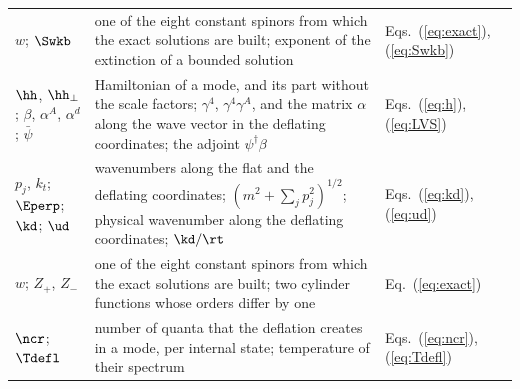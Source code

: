\begin{table}
\begin{ruledtabular}
\begin{tabular}{p{}p{}p{}}
$w$; $\Swkb$ & one of the eight constant spinors from which the exact solutions are built; exponent of the extinction of a bounded solution & Eqs.~(\ref{eq:exact}), (\ref{eq:Swkb}) \\
$\hh$, $\hh_\perp$; $\beta$, $\alpha^{A}$, $\alpha^{d}$; $\bar\psi$ & Hamiltonian of a mode, and its part without the scale factors; $\gamma^{4}$, $\gamma^{4}\gamma^{A}$, and the matrix $\alpha$ along the wave vector in the deflating coordinates; the adjoint $\psi^\dagger\beta$ & Eqs.~(\ref{eq:h}), (\ref{eq:LVS}) \\
$p_j$, $k_t$; $\Eperp$; $\kd$; $\ud$ & wavenumbers along the flat and the deflating coordinates; $(m^{2}+\sum_jp_j^{2})^{1/2}$; physical wavenumber along the deflating coordinates; $\kd/\rt$ & Eqs.~(\ref{eq:kd}), (\ref{eq:ud}) \\
$w$; $Z_+$, $Z_-$ & one of the eight constant spinors from which the exact solutions are built; two cylinder functions whose orders differ by one & Eq.~(\ref{eq:exact}) \\
$\ncr$; $\Tdefl$ & number of quanta that the deflation creates in a mode, per internal state; temperature of their spectrum & Eqs.~(\ref{eq:ncr}), (\ref{eq:Tdefl}) \\
\end{tabular}
\end{ruledtabular}
\end{table}

